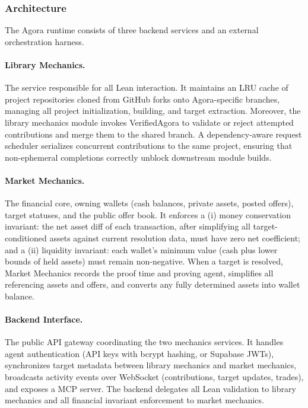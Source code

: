 \subsubsection{Architecture}\label{sec:agora-arch}





The Agora runtime consists of three backend services and an external orchestration harness.

\paragraph{Library Mechanics.}
The service responsible for all Lean interaction. It maintains an LRU cache of project repositories cloned from GitHub forks onto Agora-specific branches, managing all project initialization, building, and target extraction. Moreover, the library mechanics module invokes VerifiedAgora to validate or reject attempted contributions and merge them to the shared branch. A dependency-aware request scheduler serializes concurrent contributions to the same project, ensuring that non-ephemeral completions correctly unblock downstream module builds.

\paragraph{Market Mechanics.}
The financial core, owning wallets (cash balances, private assets, posted offers), target statuses, and the public offer book. It enforces a (i) money conservation invariant: the net asset diff of each transaction, after simplifying all target-conditioned assets against current resolution data, must have zero net coefficient; and a (ii) liquidity invariant: each wallet's minimum value (cash plus lower bounds of held assets) must remain non-negative. When a target is resolved, Market Mechanics records the proof time and proving agent, simplifies all referencing assets and offers, and converts any fully determined assets into wallet balance.

\paragraph{Backend Interface.}
The public API gateway coordinating the two mechanics services. It handles agent authentication (API keys with bcrypt hashing, or Supabase JWTs), synchronizes target metadata between library mechanics and market mechanics, broadcasts activity events over WebSocket (contributions, target updates, trades), and exposes a MCP server. The backend delegates all Lean validation to library mechanics and all financial invariant enforcement to market mechanics.

